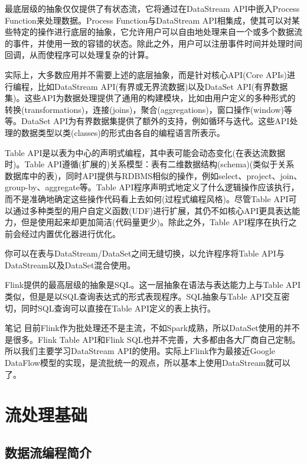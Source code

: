 \documentclass[oneside]{ctexbook}
\begin{document}
最底层级的抽象仅仅提供了有状态流，它将通过在DataStream API中嵌入Process Function来处理数据。Process Function与DataStream API相集成，使其可以对某些特定的操作进行底层的抽象，它允许用户可以自由地处理来自一个或多个数据流的事件，并使用一致的容错的状态。除此之外，用户可以注册事件时间并处理时间回调，从而使程序可以处理复杂的计算。

实际上，大多数应用并不需要上述的底层抽象，而是针对核心API(Core APIs)进行编程，比如DataStream API(有界或无界流数据)以及DataSet API(有界数据集)。这些API为数据处理提供了通用的构建模块，比如由用户定义的多种形式的转换(transformations)，连接(joins)，聚合(aggregations)，窗口操作(window)等等。DataSet API为有界数据集提供了额外的支持，例如循环与迭代。这些API处理的数据类型以类(classes)的形式由各自的编程语言所表示。

Table API是以表为中心的声明式编程，其中表可能会动态变化(在表达流数据时)。Table API遵循(扩展的)关系模型：表有二维数据结构(schema)(类似于关系数据库中的表)，同时API提供与RDBMS相似的操作，例如select、project、join、group-by、aggregate等。Table API程序声明式地定义了什么逻辑操作应该执行，而不是准确地确定这些操作代码看上去如何(过程式编程风格)。尽管Table API可以通过多种类型的用户自定义函数(UDF)进行扩展，其仍不如核心API更具表达能力，但是使用起来却更加简洁(代码量更少)。除此之外，Table API程序在执行之前会经过内置优化器进行优化。

你可以在表与DataStream/DataSet之间无缝切换，以允许程序将Table API与DataStream以及DataSet混合使用。

Flink提供的最高层级的抽象是SQL。这一层抽象在语法与表达能力上与Table API类似，但是是以SQL查询表达式的形式表现程序。SQL抽象与Table API交互密切，同时SQL查询可以直接在Table API定义的表上执行。

\begin{bclogo}[logo=\bcinfo, couleurBarre=orange, noborder=true, couleur=white]{笔记}
目前Flink作为批处理还不是主流，不如Spark成熟，所以DataSet使用的并不是很多。Flink Table API和Flink SQL也并不完善，大多都由各大厂商自己定制。所以我们主要学习DataStream API的使用。实际上Flink作为最接近Google DataFlow模型的实现，是流批统一的观点，所以基本上使用DataStream就可以了。
\end{bclogo}

\chapter{流处理基础}

\section{数据流编程简介}
\end{document}

